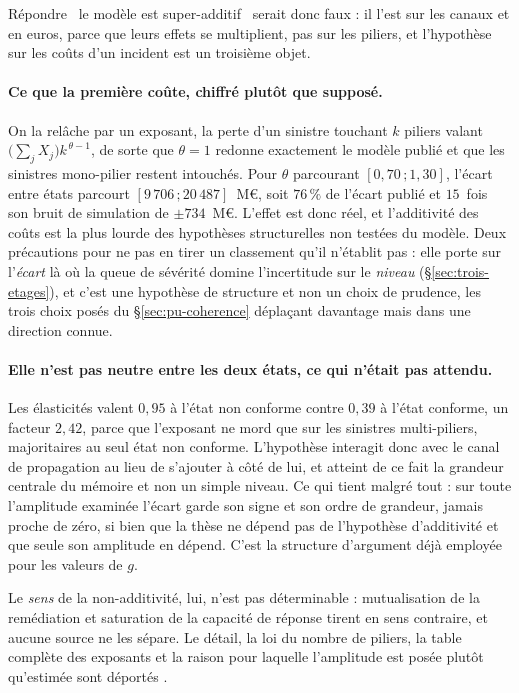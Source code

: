 \noindent Répondre \og~le modèle est super-additif~\fg{} serait donc faux : il l'est sur les canaux
et en euros, parce que leurs effets se multiplient, pas sur les piliers, et l'hypothèse sur les
coûts d'un incident est un troisième objet.

\paragraph{Ce que la première coûte, chiffré plutôt que supposé.} On la relâche par un exposant, la
perte d'un sinistre touchant $k$ piliers valant $\bigl(\sum_j X_j\bigr)k^{\,\theta-1}$, de sorte que
$\theta=1$ redonne exactement le modèle publié et que les sinistres mono-pilier restent intouchés.
Pour $\theta$ parcourant $[0{,}70\,;1{,}30]$, l'écart entre états parcourt
$[9\,706\,;20\,487]$~M\euro, soit $76\,\%$ de l'écart publié et $15$~fois son bruit de simulation de
$\pm 734$~M\euro. L'effet est donc réel, et l'additivité des coûts est la plus lourde des
hypothèses structurelles non testées du modèle. Deux précautions pour ne pas en tirer un classement
qu'il n'établit pas : elle porte sur l'\emph{écart} là où la queue de sévérité domine l'incertitude
sur le \emph{niveau} (\S\ref{sec:trois-etages}), et c'est une hypothèse de structure et non un choix
de prudence, les trois choix posés du \S\ref{sec:pu-coherence} déplaçant davantage mais dans une
direction connue.

\paragraph{Elle n'est pas neutre entre les deux états, ce qui n'était pas attendu.} Les élasticités
valent $0{,}95$ à l'état non conforme contre $0{,}39$ à l'état conforme, un facteur $2{,}42$, parce
que l'exposant ne mord que sur les sinistres multi-piliers, majoritaires au seul état non conforme.
L'hypothèse interagit donc avec le canal de propagation au lieu de s'ajouter à côté de lui,
et atteint de ce fait la grandeur centrale du mémoire et non un simple niveau. Ce qui tient malgré
tout : sur toute l'amplitude examinée l'écart garde son signe et son ordre de grandeur, jamais
proche de zéro, si bien que la thèse ne dépend pas de l'hypothèse d'additivité et que seule son
amplitude en dépend. C'est la structure d'argument déjà employée pour les valeurs de $g$.

Le \emph{sens} de la non-additivité, lui, n'est pas déterminable : mutualisation de la remédiation
et saturation de la capacité de réponse tirent en sens contraire, et aucune source ne les sépare. Le
détail, la loi du nombre de piliers, la table complète des exposants et la raison pour laquelle
l'amplitude est posée plutôt qu'estimée sont déportés \matcomp.

